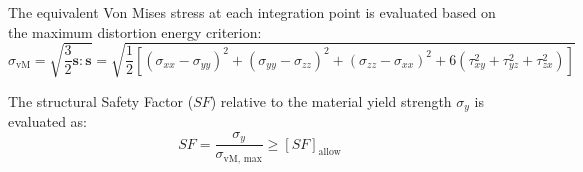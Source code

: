 \documentclass[12pt,a4paper]{article}
\begin{document}
The equivalent Von Mises stress at each integration point is evaluated based on the maximum distortion energy criterion:
\begin{equation}
    \sigma_{\text{vM}} = \sqrt{\frac{3}{2} \mathbf{s} : \mathbf{s}} = \sqrt{\frac{1}{2} \left[ (\sigma_{xx} - \sigma_{yy})^2 + (\sigma_{yy} - \sigma_{zz})^2 + (\sigma_{zz} - \sigma_{xx})^2 + 6(\tau_{xy}^2 + \tau_{yz}^2 + \tau_{zx}^2) \right]}
\end{equation}

The structural Safety Factor ($SF$) relative to the material yield strength $\sigma_y$ is evaluated as:
\begin{equation}
    SF = \frac{\sigma_y}{\sigma_{\text{vM, max}}} \ge [SF]_{\text{allow}}
\end{equation}
\end{document}
